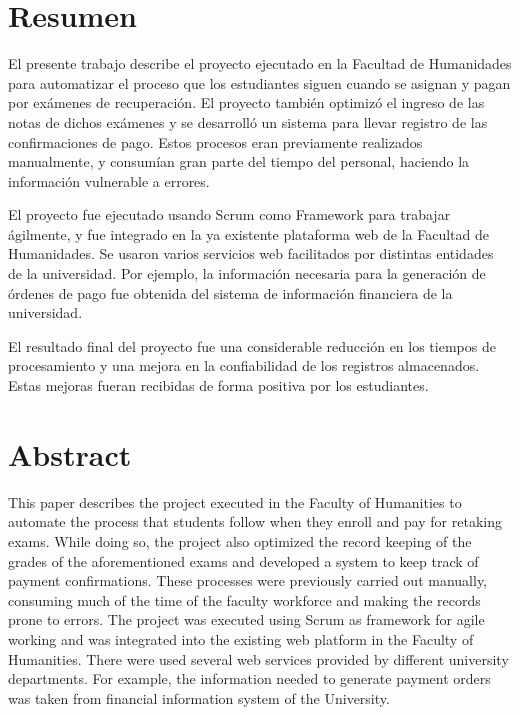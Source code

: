 \documentclass[12pt,spanish,Letterpaper,openany]{book}
\begin{document}
\hypertarget{resumen-1}{%
\section*{Resumen}\label{resumen-1}}

El presente trabajo describe el proyecto ejecutado en la Facultad de Humanidades para automatizar el proceso que los estudiantes siguen cuando se asignan y pagan por exámenes de recuperación. El proyecto también optimizó el ingreso de las notas de dichos exámenes y se desarrolló un sistema para llevar registro de las confirmaciones de pago. Estos procesos eran previamente realizados manualmente, y consumían gran parte del tiempo del personal, haciendo la información vulnerable a errores.

El proyecto fue ejecutado usando Scrum como Framework para trabajar ágilmente, y fue integrado en la ya existente plataforma web de la Facultad de Humanidades. Se usaron varios servicios web facilitados por distintas entidades de la universidad. Por ejemplo, la información necesaria para la generación de órdenes de pago fue obtenida del sistema de información financiera de la universidad.

El resultado final del proyecto fue una considerable reducción en los tiempos de procesamiento y una mejora en la confiabilidad de los registros almacenados. Estas mejoras fueran recibidas de forma positiva por los estudiantes.

\hypertarget{abstract-1}{%
\section*{Abstract}\label{abstract-1}}

This paper describes the project executed in the Faculty of Humanities to automate the process that students follow when they enroll and pay for retaking exams. While doing so, the project also optimized the record keeping of the grades of the aforementioned exams and developed a system to keep track of payment confirmations. These processes were previously carried out manually, consuming much of the time of the faculty workforce and making the records prone to errors.
The project was executed using Scrum as framework for agile working and was integrated into the existing web platform in the Faculty of Humanities. There were used several web services provided by different university departments. For example, the information needed to generate payment orders was taken from financial information system of the University.
\end{document}
